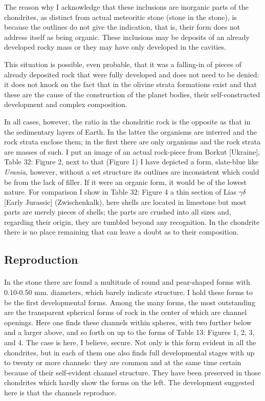 \documentclass[a4paper, 12pt, oneside]{article}
\begin{document}
The reason why I acknowledge that these inclusions are inorganic parts of the chondrites, as distinct from actual meteoritic stone (stone in the stone), is because the outlines do not give the indication, that is, their form does not address itself as being organic. These inclusions may be deposits of an already developed rocky mass or they may have only developed in the cavities.

This situation is possible, even probable, that it was a falling-in of pieces of already deposited rock that were fully developed and does not need to be denied: it does not knock on the fact that in the olivine strata formations exist and that these are the cause of the construction of the planet bodies, their self-constructed development and complex composition.

In all cases, however, the ratio in the chondritic rock is the opposite as that in the sedimentary layers of Earth. In the latter the organisms are interred and the rock strata enclose them; in the first there are only organisms and the rock strata are masses of such. I put an image of an actual rock-piece from Borkut [Ukraine], Table 32: Figure 2, next to that (Figure 1) I have depicted a form, slate-blue like \emph{Urania}, however, without a set structure its outlines are inconsistent which could be from the lack of filler. If it were an organic form, it would be of the lowest nature. For comparison I show in Table 32: Figure 4 a thin section of Lias $\gamma\delta$ [Early Jurassic] (Zwischenkalk), here shells are located in limestone but most parts are merely pieces of shells; the parts are crushed into all sizes and, regarding their origin, they are tumbled beyond any recognition. In the chondrite there is no place remaining that can leave a doubt as to their composition.
\clearpage
\subsection{Reproduction}
\paragraph*{}
In the stone there are found a multitude of round and pear-shaped forms with 0.10-0.50 mm. diameters, which barely indicate structure. I hold these forms to be the first developmental forms. Among the many forms, the most outstanding are the transparent spherical forms of rock in the center of which are channel openings. Here one finds these channels within spheres, with two further below and a larger above, and so forth on up to the forms of Table 13: Figures 1, 2, 3, and 4. The case is here, I believe, secure. Not only is this form evident in all the chondrites, but in each of them one also finds full developmental stages with up to twenty or more channels: they are common and at the same time certain because of their self-evident channel structure. They have been preserved in those chondrites which hardly show the forms on the left. The development suggested here is that the channels reproduce.
\end{document}
